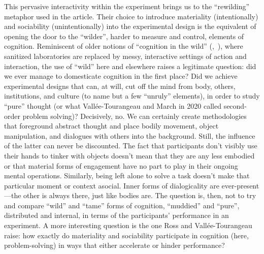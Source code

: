 \documentclass[twocolumn, serif, reflection, authordate]{jote-article}
\begin{document}
This pervasive interactivity within the experiment brings us to the
``rewilding'' metaphor used in the article. Their choice to introduce
materiality (intentionally) and sociability (unintentionally) into the
experimental design is the equivalent of opening the door to the
``wilder'', harder to measure and control, elements of cognition.
Reminiscent of older notions of ``cognition in the wild'' (,~\citeyear{Hutchins1995}), where sanitized laboratories are replaced by messy, interactive
settings of action and interaction, the use of ``wild'' here and
elsewhere raises a legitimate question: did we ever manage to
domesticate cognition in the first place? Did we achieve experimental
designs that can, at will, cut off the mind from body, others,
institutions, and culture (to name but a few ``unruly'' elements), in
order to study ``pure'' thought (or what Vallée-Tourangeau and March in
2020 called second-order problem solving)? Decisively, no. We can
certainly create methodologies that foreground abstract thought and
place bodily movement, object manipulation, and dialogues with others
into the background. Still, the influence of the latter can never be
discounted. The fact that participants don't visibly use their hands to
tinker with objects doesn't mean that they are any less embodied or that
material forms of engagement have no part to play in their ongoing
mental operations. Similarly, being left alone to solve a task doesn't
make that particular moment or context asocial. Inner forms of
dialogicality are ever-present---the other is always there, just like
bodies are. The question is, then, not to try and compare ``wild'' and
``tame'' forms of cognition, ``muddied'' and ``pure'', distributed and
internal, in terms of the participants' performance in an experiment. A
more interesting question is the one Ross and Vallée-Tourangeau raise:
how exactly do materiality and sociability participate in cognition
(here, problem-solving) in ways that either accelerate or hinder
performance?
\end{document}
